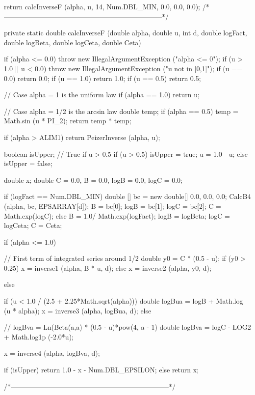 \begin{code}
\begin{hide} {
      return calcInverseF (alpha, u, 14, Num.DBL_MIN, 0.0, 0.0, 0.0);
   }
   /*---------------------------------------------------------------------*/

   private static double calcInverseF (double alpha, double u, int d,
          double logFact, double logBeta, double logCeta, double Ceta) {
      if (alpha <= 0.0)
         throw new IllegalArgumentException ("alpha <= 0");
      if (u > 1.0 || u < 0.0)
         throw new IllegalArgumentException ("u not in [0,1]");
      if (u == 0.0) return 0.0;
      if (u == 1.0) return 1.0;
      if (u == 0.5) return 0.5;

      // Case alpha = 1 is the uniform law
      if (alpha == 1.0) return u;

      // Case alpha = 1/2 is the arcsin law
      double temp;
      if (alpha == 0.5) {
         temp = Math.sin (u * PI_2);
         return temp * temp;
      }

      if (alpha > ALIM1)
         return PeizerInverse (alpha, u);

      boolean isUpper;             // True if u > 0.5
      if (u > 0.5) {
         isUpper = true;
         u = 1.0 - u;
      } else
         isUpper = false;

      double x;
      double C = 0.0, B = 0.0, logB = 0.0, logC = 0.0;

      if (logFact == Num.DBL_MIN) {
         double [] bc = new double[] {0.0, 0.0, 0.0};
         CalcB4 (alpha, bc, EPSARRAY[d]);
         B = bc[0]; logB = bc[1]; logC = bc[2];
	 C = Math.exp(logC);
      } else {
         B = 1.0/ Math.exp(logFact);
         logB = logBeta;
         logC = logCeta;
         C = Ceta;
      }

      if (alpha <= 1.0) {
         // First term of integrated series around 1/2
	 double y0 = C * (0.5 - u);
         if (y0 > 0.25)
            x = inverse1 (alpha, B * u, d);
         else
            x = inverse2 (alpha, y0, d);

      } else {
         if (u < 1.0 / (2.5 + 2.25*Math.sqrt(alpha))) {
            double logBua = logB + Math.log (u * alpha);
            x = inverse3 (alpha, logBua, d);
         } else {
            // logBva = Ln(Beta(a,a) * (0.5 - u)*pow(4, a - 1)
            double logBva = logC - LOG2 + Math.log1p (-2.0*u);

            x = inverse4 (alpha, logBva, d);
         }
      }

      if (isUpper)
         return 1.0 - x - Num.DBL_EPSILON;
      else
         return x;
   }

   /*---------------------------------------------------------------------*/


\end{hide}
\end{code}
